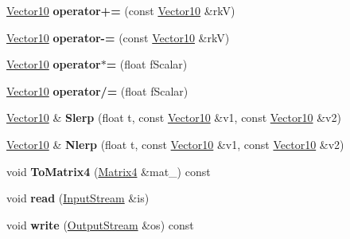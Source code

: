 \begin{DoxyCompactItemize}
\item 
\hyperlink{class_magnum_1_1_vector10}{Vector10} {\bfseries operator+=} (const \hyperlink{class_magnum_1_1_vector10}{Vector10} \&rkV)\hypertarget{class_magnum_1_1_vector10_aab1a4d9f0a487bbfdfbcc8b8140d22c6}{}\label{class_magnum_1_1_vector10_aab1a4d9f0a487bbfdfbcc8b8140d22c6}

\item 
\hyperlink{class_magnum_1_1_vector10}{Vector10} {\bfseries operator-\/=} (const \hyperlink{class_magnum_1_1_vector10}{Vector10} \&rkV)\hypertarget{class_magnum_1_1_vector10_a39cef899c99c030438e9512f6f2e3da2}{}\label{class_magnum_1_1_vector10_a39cef899c99c030438e9512f6f2e3da2}

\item 
\hyperlink{class_magnum_1_1_vector10}{Vector10} {\bfseries operator$\ast$=} (float f\+Scalar)\hypertarget{class_magnum_1_1_vector10_a72075716f6a1cc1a67292e4077284c2c}{}\label{class_magnum_1_1_vector10_a72075716f6a1cc1a67292e4077284c2c}

\item 
\hyperlink{class_magnum_1_1_vector10}{Vector10} {\bfseries operator/=} (float f\+Scalar)\hypertarget{class_magnum_1_1_vector10_a62db9fe111d06d12a8c8015e10b6dbf6}{}\label{class_magnum_1_1_vector10_a62db9fe111d06d12a8c8015e10b6dbf6}

\item 
\hyperlink{class_magnum_1_1_vector10}{Vector10} \& {\bfseries Slerp} (float t, const \hyperlink{class_magnum_1_1_vector10}{Vector10} \&v1, const \hyperlink{class_magnum_1_1_vector10}{Vector10} \&v2)\hypertarget{class_magnum_1_1_vector10_a7d500af40d4cafcc97b23aec102f9e7f}{}\label{class_magnum_1_1_vector10_a7d500af40d4cafcc97b23aec102f9e7f}

\item 
\hyperlink{class_magnum_1_1_vector10}{Vector10} \& {\bfseries Nlerp} (float t, const \hyperlink{class_magnum_1_1_vector10}{Vector10} \&v1, const \hyperlink{class_magnum_1_1_vector10}{Vector10} \&v2)\hypertarget{class_magnum_1_1_vector10_a452794484f03970e4e7942856112f145}{}\label{class_magnum_1_1_vector10_a452794484f03970e4e7942856112f145}

\item 
void {\bfseries To\+Matrix4} (\hyperlink{class_magnum_1_1_matrix4}{Matrix4} \&mat\+\_\+) const \hypertarget{class_magnum_1_1_vector10_a937915ae7628ab201cd9e18504c31949}{}\label{class_magnum_1_1_vector10_a937915ae7628ab201cd9e18504c31949}

\item 
void {\bfseries read} (\hyperlink{class_magnum_1_1_input_stream}{Input\+Stream} \&is)\hypertarget{class_magnum_1_1_vector10_a9b27d0a53a31d97e43641f0868b48eac}{}\label{class_magnum_1_1_vector10_a9b27d0a53a31d97e43641f0868b48eac}

\item 
void {\bfseries write} (\hyperlink{class_magnum_1_1_output_stream}{Output\+Stream} \&os) const \hypertarget{class_magnum_1_1_vector10_ac0b8af4402c85cd9b1544ce98a75d032}{}\label{class_magnum_1_1_vector10_ac0b8af4402c85cd9b1544ce98a75d032}

\end{DoxyCompactItemize}
